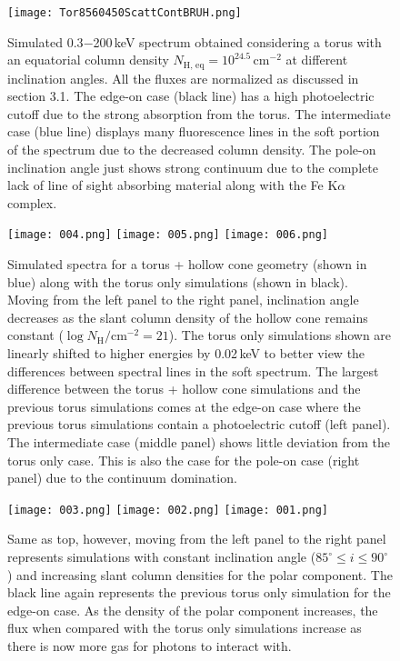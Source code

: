 \documentclass[fleqn,usenatbib]{mnras}
\begin{document}
        \begin{figure} 
            \centering
            \texttt{[image: Tor8560450ScattContBRUH.png]}
            \caption{Simulated 0.3$-$200\,keV spectrum obtained considering a torus with an equatorial column density $N_{\text{H, eq}} = 10^{24.5}$\,cm$^{-2}$ at different inclination angles. All the fluxes are normalized as discussed in section 3.1. The edge-on case (black line) has a high photoelectric cutoff due to the strong absorption from the torus. The intermediate case (blue line) displays many fluorescence lines in the soft portion of the spectrum due to the decreased column density. The pole-on inclination angle just shows strong continuum due to the complete lack of line of sight absorbing material along with the Fe K$\alpha$ complex.}
            \label{fig2}
        \end{figure}
        
        \begin{figure*}
            \ContinuedFloat*
            \texttt{[image: 004.png]}
            \texttt{[image: 005.png]}
            \texttt{[image: 006.png]}
            \caption{\label{fig3a}Simulated spectra for a torus + hollow cone geometry (shown in blue) along with the torus only simulations (shown in black). Moving from the left panel to the right panel, inclination angle decreases as the slant column density of the hollow cone remains constant ($\log{N_{\text{H}}}\big/\text{cm}^{-2} = 21$). The torus only simulations shown are linearly shifted to higher energies by 0.02\,keV to better view the differences between spectral lines in the soft spectrum. The largest difference between the torus + hollow cone simulations and the previous torus simulations comes at the edge-on case where the previous torus simulations contain a photoelectric cutoff (left panel). The intermediate case (middle panel) shows little deviation from the torus only case. This is also the case for the pole-on case (right panel) due to the continuum domination.}
        \end{figure*}
        \begin{figure*}
            \ContinuedFloat
            \texttt{[image: 003.png]}
            \texttt{[image: 002.png]}
            \texttt{[image: 001.png]}
            \caption{\label{fig3b}Same as top, however, moving from the left panel to the right panel represents simulations with constant inclination angle ($85^{\circ} \leq i \leq 90^{\circ}$) and increasing slant column densities for the polar component. The black line again represents the previous torus only simulation for the edge-on case. As the density of the polar component increases, the flux when compared with the torus only simulations increase as there is now more gas for photons to interact with.} 
        \end{figure*}
    
\end{document}
